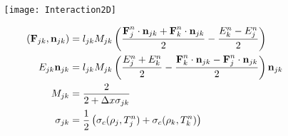 \begin{frame}
\begin{columns}
\begin{column}{0.6\textwidth}
    \end{column}
    \begin{column}{0.4\textwidth}
      \texttt{[image: Interaction2D]}       
       \begin{center}
        \begingroup
        \tiny
        \begin{align*}
          \left(\textbf{F}_{jk}, \textbf{n}_{jk} \right) &= l_{jk} M_{jk} \left( \frac{\textbf{F}_j^n \cdot \textbf{n}_{jk} + \textbf{F}_k^n \cdot \textbf{n}_{jk}}{2} - \frac{E_k^n - E_j^n}{2} \right) \\
          E_{jk} \textbf{n}_{jk} &= l_{jk} M_{jk} \left( \frac{E_j^n + E_k^n}{2} - \frac{\textbf{F}_k^n \cdot \textbf{n}_{jk} - \textbf{F}_j^n \cdot \textbf{n}_{jk}}{2} \right) \textbf{n}_{jk} \\
          M_{jk} &= \frac{2}{2 + \Delta x \sigma_{jk}}  \\
          \sigma_{jk} &= \frac{1}{2} \left( \sigma_c(\rho_j,T_j^n) + \sigma_c(\rho_k,T_k^n) \right)
         \end{align*}
        \endgroup
       \end{center}
    \end{column}
   \end{columns}
\end{frame}

